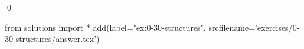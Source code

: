 
\begin{ex}
  \label{ex:0-30-structures}
  
  \qed
\end{ex}
\begin{python0}
from solutions import *
add(label="ex:0-30-structures",
    srcfilename='exercises/0-30-structures/answer.tex')
\end{python0}
